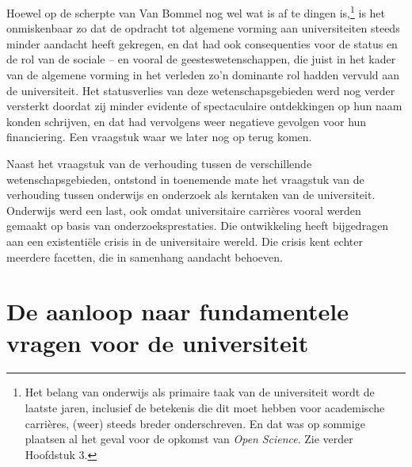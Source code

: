 \documentclass[smallauthor, chapterhaspagenum, nochapterinheader, pagenuminheader,  bigchapnum,medium2, tocpages,  garamond, titleinheader]{jote-book}
\begin{document}
	Hoewel op de scherpte van Van Bommel nog wel wat is af te dingen is,\footnote{Het belang van onderwijs als primaire taak van de universiteit wordt de laatste jaren, inclusief de betekenis die dit moet hebben voor academische carrières, (weer) steeds breder onderschreven. En dat was op sommige plaatsen al het geval voor de opkomst van \emph{Open }\emph{Science}. Zie verder Hoofdstuk 3.} is het onmiskenbaar zo dat de opdracht tot algemene vorming aan universiteiten steeds minder aandacht heeft gekregen, en dat had ook consequenties voor de status en de rol van de sociale -- en vooral de geesteswetenschappen, die juist in het kader van de algemene vorming in het verleden zo'n dominante rol hadden vervuld aan de universiteit. Het statusverlies van deze wetenschapsgebieden werd nog verder versterkt doordat zij minder evidente of spectaculaire ontdekkingen op hun naam konden schrijven, en dat had vervolgens weer negatieve gevolgen voor hun financiering. Een vraagstuk waar we later nog op terug komen.



	Naast het vraagstuk van de verhouding tussen de verschillende wetenschapsgebieden, ontstond in toenemende mate het vraagstuk van de verhouding tussen onderwijs en onderzoek als kerntaken van de universiteit. Onderwijs werd een last, ook omdat universitaire carrières vooral werden gemaakt op basis van onderzoeksprestaties. Die ontwikkeling heeft bijgedragen aan een existentiële crisis in de universitaire wereld. Die crisis kent echter meerdere facetten, die in samenhang aandacht behoeven.



	\section{De aanloop naar fundamentele vragen voor de universiteit}
\end{document}
